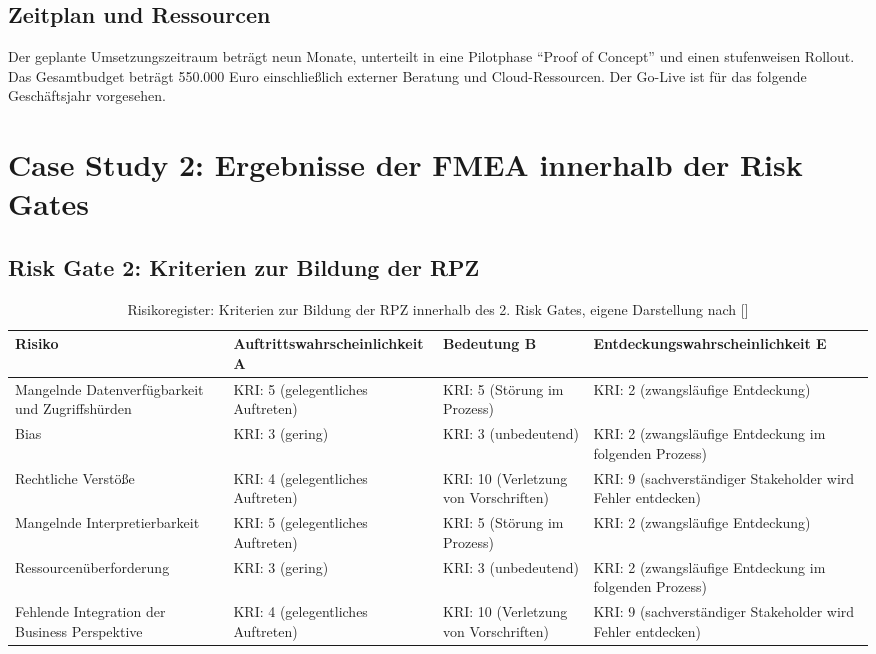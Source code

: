\subsection{Zeitplan und Ressourcen}
Der geplante Umsetzungszeitraum beträgt neun Monate,
unterteilt in eine Pilotphase
\enquote{Proof of Concept}
und einen stufenweisen Rollout.
Das Gesamtbudget beträgt 550.000 Euro
einschließlich externer Beratung und Cloud-Ressourcen.
Der Go-Live ist für das folgende Geschäftsjahr vorgesehen.

\section{Case Study 2: Ergebnisse der FMEA innerhalb der Risk Gates}

\subsection{Risk Gate 2: Kriterien zur Bildung der RPZ}
\begin{table}[H]
\centering
\renewcommand{\arraystretch}{1.3}
\begin{tabular}{|p{3cm}|p{4.9cm}|p{3cm}|p{4.9cm}|}
\hline
\textbf{Risiko} & \textbf{Auftritts\-wahrscheinlichkeit A} & \textbf{Bedeutung B} & \textbf{Entdeckungs\-wahrscheinlichkeit E} \\
\hline

Mangelnde Datenverfügbarkeit und Zugriffshürden 
& KRI: 5 (gelegentliches Auftreten)
& KRI: 5 (Störung im Prozess)
& KRI: 2 (zwangsläufige Entdeckung) \\
\hline

Bias 
& KRI: 3 (gering)
& KRI: 3 (unbedeutend)
& KRI: 2 (zwangsläufige Entdeckung im folgenden Prozess) \\
\hline

Rechtliche Verstöße
& KRI: 4 (gelegentliches Auftreten)
& KRI: 10 (Verletzung von Vorschriften)
& KRI: 9 (sachverständiger Stakeholder wird Fehler entdecken) \\
\hline

Mangelnde Interpretierbarkeit
& KRI: 5 (gelegentliches Auftreten)
& KRI: 5 (Störung im Prozess)
& KRI: 2 (zwangsläufige Entdeckung) \\
\hline

Ressourcenüberforderung
& KRI: 3 (gering)
& KRI: 3 (unbedeutend)
& KRI: 2 (zwangsläufige Entdeckung im folgenden Prozess) \\
\hline

Fehlende Integration der Business Perspektive
& KRI: 4 (gelegentliches Auftreten)
& KRI: 10 (Verletzung von Vorschriften)
& KRI: 9 (sachverständiger Stakeholder wird Fehler entdecken) \\
\hline

\end{tabular}
\caption{Risikoregister: Kriterien zur Bildung der RPZ innerhalb des 2. Risk Gates, eigene Darstellung nach []}
\label{tab:kriterien_rpz}
\end{table}


